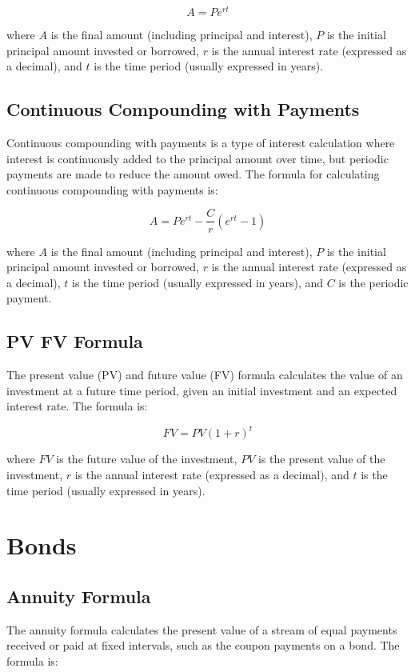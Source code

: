 \documentclass{article}
\theoremstyle{mytheoremstyle}
\theoremstyle{mytheoremstyle}
\theoremstyle{myproblemstyle}
\begin{document}
\begin{equation}
A = Pe^{rt}
\end{equation}

where $A$ is the final amount (including principal and interest), $P$ is the initial principal amount invested or borrowed, $r$ is the annual interest rate (expressed as a decimal), and $t$ is the time period (usually expressed in years).

\subsection{Continuous Compounding with Payments}
Continuous compounding with payments is a type of interest calculation where interest is continuously added to the principal amount over time, but periodic payments are made to reduce the amount owed. The formula for calculating continuous compounding with payments is:

\begin{equation}
A = P e^{rt} - \frac{C}{r} \left( e^{rt} - 1 \right)
\end{equation}

where $A$ is the final amount (including principal and interest), $P$ is the initial principal amount invested or borrowed, $r$ is the annual interest rate (expressed as a decimal), $t$ is the time period (usually expressed in years), and $C$ is the periodic payment.

\subsection{PV FV Formula}
The present value (PV) and future value (FV) formula calculates the value of an investment at a future time period, given an initial investment and an expected interest rate. The formula is:

\begin{equation}
FV = PV \left( 1 + r \right) ^t
\end{equation}

where $FV$ is the future value of the investment, $PV$ is the present value of the investment, $r$ is the annual interest rate (expressed as a decimal), and $t$ is the time period (usually expressed in years).


\section{Bonds}

\subsection{Annuity Formula}
The annuity formula calculates the present value of a stream of equal payments received or paid at fixed intervals, such as the coupon payments on a bond. The formula is:
\end{document}
